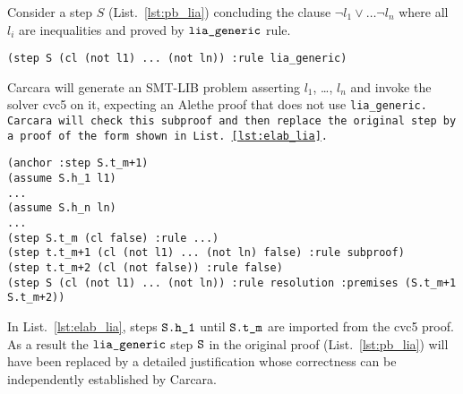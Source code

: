 \begin{example}

Consider a step $S$ (List.~\ref{lst:pb_lia}) concluding the clause $\neg l_1 \lor \dots \neg l_n$ where all $l_i$ are inequalities and proved by $\tt{lia\_generic}$ rule.
    
\begin{lstlisting}[language=SMT,caption={Elaborated proof},label={lst:pb_lia}]
    (step S (cl (not l1) ... (not ln)) :rule lia_generic)
\end{lstlisting}
%
Carcara will generate an SMT-LIB problem asserting $l_1$, \dots, $l_n$ and invoke the solver cvc5 on it, expecting an Alethe proof 
that does not use \tt{lia\_generic}. Carcara will check this subproof and then replace the original step by a proof of the form shown in List.~\ref{lst:elab_lia}.

\begin{lstlisting}[language=SMT,caption={Elaboration of \tt{lia\_generic}},label={lst:elab_lia}]
(anchor :step S.t_m+1)
(assume S.h_1 l1)
...
(assume S.h_n ln)
...
(step S.t_m (cl false) :rule ...)
(step t.t_m+1 (cl (not l1) ... (not ln) false) :rule subproof)
(step t.t_m+2 (cl (not false)) :rule false)
(step S (cl (not l1) ... (not ln)) :rule resolution :premises (S.t_m+1 S.t_m+2))
\end{lstlisting}

In List.~\ref{lst:elab_lia}, steps $\tt{S.h\_1}$ until $\tt{S.t\_m}$ are imported from the cvc5 proof.
As a result the $\tt{lia\_generic}$ step $\tt{S}$ in the original proof (List.~\ref{lst:pb_lia}) will have been replaced by a detailed justification whose correctness can be independently established by Carcara.

\end{example}
